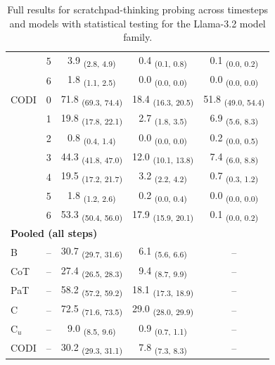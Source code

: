 \begin{table}[h!]
\begin{tabular}{ll ccc}
 & 5 & 3.9 \textsubscript{(2.8, 4.9)} & 0.4 \textsubscript{(0.1, 0.8)} & 0.1 \textsubscript{(0.0, 0.2)} \\
 & 6 & 1.8 \textsubscript{(1.1, 2.5)} & 0.0 \textsubscript{(0.0, 0.0)} & 0.0 \textsubscript{(0.0, 0.0)} \\
\midrule
CODI & 0 & 71.8 \textsubscript{(69.3, 74.4)} & 18.4 \textsubscript{(16.3, 20.5)} & 51.8 \textsubscript{(49.0, 54.4)} \\
 & 1 & 19.8 \textsubscript{(17.8, 22.1)} & 2.7 \textsubscript{(1.8, 3.5)} & 6.9 \textsubscript{(5.6, 8.3)} \\
 & 2 & 0.8 \textsubscript{(0.4, 1.4)} & 0.0 \textsubscript{(0.0, 0.0)} & 0.2 \textsubscript{(0.0, 0.5)} \\
 & 3 & 44.3 \textsubscript{(41.8, 47.0)} & 12.0 \textsubscript{(10.1, 13.8)} & 7.4 \textsubscript{(6.0, 8.8)} \\
 & 4 & 19.5 \textsubscript{(17.2, 21.7)} & 3.2 \textsubscript{(2.2, 4.2)} & 0.7 \textsubscript{(0.3, 1.2)} \\
 & 5 & 1.8 \textsubscript{(1.2, 2.6)} & 0.2 \textsubscript{(0.0, 0.4)} & 0.0 \textsubscript{(0.0, 0.0)} \\
 & 6 & 53.3 \textsubscript{(50.4, 56.0)} & 17.9 \textsubscript{(15.9, 20.1)} & 0.1 \textsubscript{(0.0, 0.2)} \\
\midrule
\multicolumn{5}{l}{\textbf{Pooled (all steps)}} \\
B & -- & 30.7 \textsubscript{(29.7, 31.6)} & 6.1 \textsubscript{(5.6, 6.6)} & -- \\
CoT & -- & 27.4 \textsubscript{(26.5, 28.3)} & 9.4 \textsubscript{(8.7, 9.9)} & -- \\
PaT & -- & 58.2 \textsubscript{(57.2, 59.2)} & 18.1 \textsubscript{(17.3, 18.9)} & -- \\
C & -- & 72.5 \textsubscript{(71.6, 73.5)} & 29.0 \textsubscript{(28.0, 29.9)} & -- \\
C$_u$ & -- & 9.0 \textsubscript{(8.5, 9.6)} & 0.9 \textsubscript{(0.7, 1.1)} & -- \\
CODI & -- & 30.2 \textsubscript{(29.3, 31.1)} & 7.8 \textsubscript{(7.3, 8.3)} & -- \\
\bottomrule
\end{tabular}
\caption{Full results for scratchpad-thinking probing across timesteps and models with statistical testing for the Llama-3.2 model family.}
\label{tab:scratchpad_llama}
\end{table}
